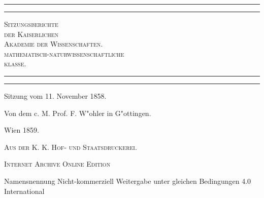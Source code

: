 \documentclass[a4paper, 11pt, oneside]{article}
\begin{document}
\frakfamily
\renewcommand{\contentsname}{
\frakfamily{Inhaltsverzeichnis}
}
\begin{titlepage} %
	\centering %

	
	\rule{\textwidth}{1.6pt}\vspace*{-\baselineskip}\vspace*{2pt} %
	\rule{\textwidth}{0.4pt} %
	
	\vspace{1\baselineskip} %
	
	{\scshape\Huge Sitzungsberichte\\[1.25pt] der Kaiserlichen\\[1.25pt] Akademie der Wissenschaften.\\[1.25pt] mathematisch-naturwissenschaftliche\\[1.25pt] klasse.\\[1.25pt]}
	
	\vspace{1\baselineskip} %

	\rule{\textwidth}{0.4pt}\vspace*{-\baselineskip}\vspace{3.2pt} %
	\rule{\textwidth}{1.6pt} %
	
	\vspace{1\baselineskip} %
	
	
	{\LARGE Sitzung vom 11. November 1858.} %
	
	\vspace*{1\baselineskip} %
	
    {\LARGE Von dem c. M. Prof. F. W"ohler in G"ottingen.} %
    
    \vspace*{\fill}

	\vspace{1\baselineskip}

	{\Large Wien 1859.}
	
	{\Large\scshape{Aus der K. K. Hof- und Staatsdruckerei.}}
	
	\vspace{0.5\baselineskip} %

    \Large\scshape Internet Archive Online Edition  %
	
	{\Large Namensnennung Nicht-kommerziell Weitergabe unter gleichen Bedingungen 4.0 International} %
\end{titlepage}
\end{document}
